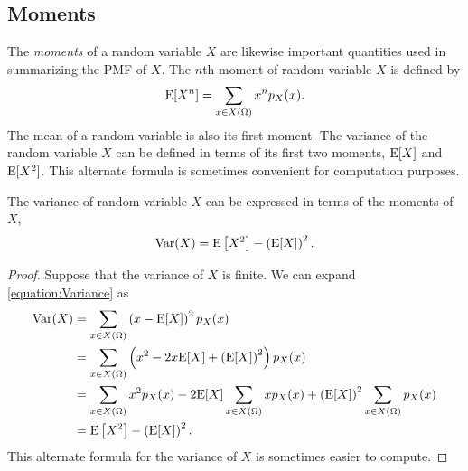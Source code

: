 \subsection{Moments}

The \emph{moments} of a random variable $X$ are likewise important quantities used in summarizing the PMF of $X$.
The $n$th moment of random variable $X$ is defined by
\begin{equation*}
\mathrm{E} [X^n] = \sum_{x \in X(\Omega)} x^n p_X (x) .
\end{equation*}
The mean of a random variable is also its first moment.
The variance of the random variable $X$ can be defined in terms of its first two moments, $\mathrm{E} [X]$ and $\mathrm{E} [X^2]$.
This alternate formula is sometimes convenient for computation purposes.

\begin{theorem}
The variance of random variable $X$ can be expressed in terms of the moments of $X$,
\begin{equation*}
\mathrm{Var} (X) = \mathrm{E} \left[ X^2 \right] - \left( \mathrm{E} [X] \right)^2.
\end{equation*}
\end{theorem}
\begin{proof}
Suppose that the variance of $X$ is finite.
We can expand \eqref{equation:Variance} as
\begin{equation*}
\begin{split}
\mathrm{Var} (X) &= \sum_{x \in X(\Omega)} \left( x - \mathrm{E} [X] \right)^2 p_X (x) \\
&= \sum_{x \in X(\Omega)} \left( x^2 - 2 x \mathrm{E} [X] + \left( \mathrm{E} [X] \right)^2 \right) p_X (x) \\
&= \sum_{x \in X(\Omega)} x^2 p_X (x) - 2 \mathrm{E} [X] \sum_{x \in X(\Omega)} x p_X (x) + \left( \mathrm{E} [X] \right)^2 \sum_{x \in X(\Omega)} p_X (x) \\
&= \mathrm{E} \left[ X^2 \right] - \left( \mathrm{E} [X] \right)^2.
\end{split}
\end{equation*}
This alternate formula for the variance of $X$ is sometimes easier to compute.
\end{proof}

